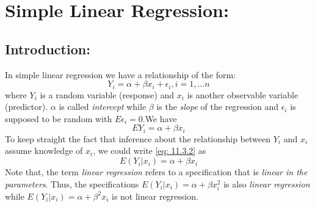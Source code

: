 \documentclass[11pt]{article}
\begin{document}
\section{Simple Linear Regression: }
\subsection{Introduction: } 
In simple linear regression we have a relationship of the form:
\begin{equation} \label{eq: 11.3.1}
	Y_i = \alpha + \beta x_i + \epsilon_i, i = 1, \dots n
\end{equation}
where $Y_i$ is a random variable (response) and $x_i$ is another observable variable (predictor). $\alpha$ is called \textit{intercept} while $\beta$ is the \textit{slope} of the regression and $\epsilon_i$ is supposed to be random with $E\epsilon_i = 0$.We have
\begin{equation} \label{eq: 11.3.2}
	EY_i = \alpha + \beta x_i
\end{equation}
To keep straight the fact that inference about the relationship between $Y_i$ and $x_i$ assume knowledge of $x_i$, we could write \ref{eq: 11.3.2} as 
\begin{equation} \label{eq: 11.3.3}
	E(Y_i|x_i) = \alpha + \beta x_i
\end{equation}
Note that, the term \textit{linear regression } refers to a specification that is \textit{linear in the parameters}. Thus, the specifications $E(Y_i|x_i) = \alpha + \beta x_i^2$ is also \textit{linear regression} while $E(Y_i|x_i) = \alpha + \beta^2 x_i$ is not linear regression.
\end{document}
